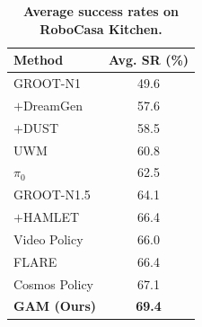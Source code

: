 \newcommand{\tabitem}{\hspace{0.3em}$+$\hspace{0.25em}}

\begin{table}
\vspace{-10pt}
\centering
\footnotesize
\setlength{\tabcolsep}{5.0pt}
\renewcommand{\arraystretch}{1.06}

\caption{\textbf{Average success rates on RoboCasa Kitchen.}}
\label{tab:training-demos-average-sr}

\begin{tabular}{@{}lc@{}}
\toprule
Method & Avg. SR (\%) \\
\midrule
GROOT-N1              & 49.6 \\
\tabitem DreamGen     & 57.6 \\
\tabitem DUST         & 58.5 \\
\addlinespace[0.25em]
UWM                   & 60.8 \\
$\pi_0$               & 62.5 \\
\addlinespace[0.25em]
GROOT-N1.5            & 64.1 \\
\tabitem HAMLET       & 66.4 \\
\addlinespace[0.25em]
Video Policy          & 66.0 \\
FLARE                 & 66.4 \\
Cosmos Policy         & 67.1 \\
\textbf{GAM (Ours)}  & \textbf{69.4} \\

\bottomrule
\end{tabular}

\vspace{-0.8em}
\end{table}